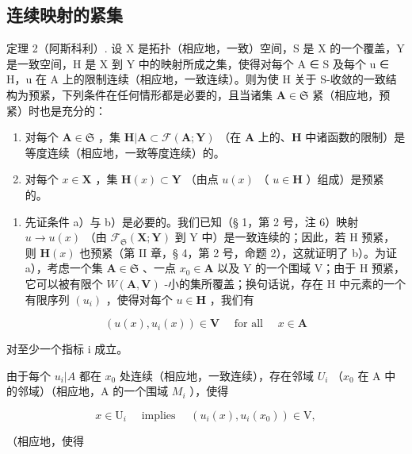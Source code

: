 \subsection{连续映射的紧集}

定理 2（阿斯科利）. 设 X 是拓扑（相应地，一致）空间，S 是 X 的一个覆盖，Y 是一致空间，H 是 X 到 Y 中的映射所成之集，使得对每个 A ∈ S 及每个 u ∈ H，u 在 A 上的限制连续（相应地，一致连续）。则为使 H 关于 S-收敛的一致结构为预紧，下列条件在任何情形都是必要的，且当诸集 \(\mathbf{A} \in \mathfrak{S}\) 紧（相应地，预紧）时也是充分的：

\begin{enumerate}
\def\labelenumi{\alph{enumi})}
\item
  对每个 \(\mathbf{A} \in \mathfrak{S}\) ，集 \(\mathbf{H}|\mathbf{A} \subset \mathcal{F}(\mathbf{A};\mathbf{Y})\) （在 \(\mathbf{A}\) 上的、\(\mathbf{H}\) 中诸函数的限制）是等度连续（相应地，一致等度连续）的。
\item
  对每个 \(x \in \mathbf{X}\) ，集 \(\mathbf{H}(x) \subset \mathbf{Y}\) （由点 \(u(x)\) （ \(u \in \mathbf{H}\) ）组成）是预紧的。
\end{enumerate}

\begin{enumerate}
\def\labelenumi{\arabic{enumi})}
\tightlist
\item
  先证条件 a）与 b）是必要的。我们已知（§ 1，第 2 号，注 6）映射 \(u \to u(x)\) （由 \(\mathcal{F}_{\mathfrak{S}}(\mathbf{X};\mathbf{Y})\) 到 Y 中）是一致连续的；因此，若 H 预紧，则 \(\mathbf{H}(x)\) 也预紧（第 II 章，§ 4，第 2 号，命题 2），这就证明了 b）。为证 a），考虑一个集 \(\mathbf{A} \in \mathfrak{S}\) 、一点 \(x_0 \in \mathbf{A}\) 以及 Y 的一个围域 V；由于 H 预紧，它可以被有限个 \(W(\mathbf{A},\mathbf{V})\) -小的集所覆盖；换句话说，存在 H 中元素的一个有限序列 \((u_i)\) ，使得对每个 \(u \in \mathbf{H}\) ，我们有
\end{enumerate}

\[
(u (x), u _ {i} (x)) \in \mathbf {V} \quad \text { for   all } \quad x \in \mathbf {A}\tag{4}
\]

对至少一个指标 i 成立。

由于每个 \(u_{i}|A\) 都在 \(x_{0}\) 处连续（相应地，一致连续），存在邻域 \(U_{i}\) （\(x_{0}\) 在 A 中的邻域）（相应地，A 的一个围域 \(M_{i}\) ），使得

\[
x \in \mathrm{U} _ {i} \quad \text { implies } \quad (u _ {i} (x), u _ {i} (x _ {0})) \in \mathrm{V},\tag{5}
\]

（相应地，使得

